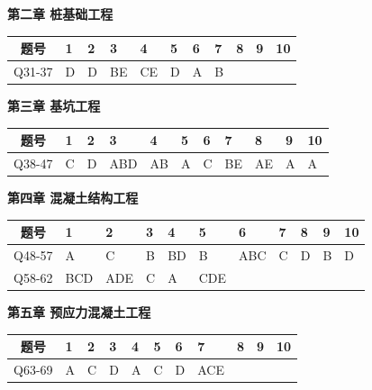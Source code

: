 \documentclass[UTF8,fontset=windows,11pt]{ctexart}
\begin{document}
\noindent\textbf{\textcolor{examnavy}{第二章  桩基础工程}}\\\vspace{0.3em}

\begin{tabularx}{\linewidth}{|c|X|X|X|X|X|X|X|X|X|X|}
\hline
\textbf{题号} & \textbf{1} & \textbf{2} & \textbf{3} & \textbf{4} & \textbf{5} & \textbf{6} & \textbf{7} & \textbf{8} & \textbf{9} & \textbf{10} \\
\hline
Q31-37 & D & D & BE & CE & D & A & B &  &  &  \\
\hline
\end{tabularx}
\vspace{0.6em}

\noindent\textbf{\textcolor{examnavy}{第三章  基坑工程}}\\\vspace{0.3em}

\begin{tabularx}{\linewidth}{|c|X|X|X|X|X|X|X|X|X|X|}
\hline
\textbf{题号} & \textbf{1} & \textbf{2} & \textbf{3} & \textbf{4} & \textbf{5} & \textbf{6} & \textbf{7} & \textbf{8} & \textbf{9} & \textbf{10} \\
\hline
Q38-47 & C & D & ABD & AB & A & C & BE & AE & A & A \\
\hline
\end{tabularx}
\vspace{0.6em}

\noindent\textbf{\textcolor{examnavy}{第四章  混凝土结构工程}}\\\vspace{0.3em}

\begin{tabularx}{\linewidth}{|c|X|X|X|X|X|X|X|X|X|X|}
\hline
\textbf{题号} & \textbf{1} & \textbf{2} & \textbf{3} & \textbf{4} & \textbf{5} & \textbf{6} & \textbf{7} & \textbf{8} & \textbf{9} & \textbf{10} \\
\hline
Q48-57 & A & C & B & BD & B & ABC & C & D & B & D \\
\hline
Q58-62 & BCD & ADE & C & A & CDE &  &  &  &  &  \\
\hline
\end{tabularx}
\vspace{0.6em}

\noindent\textbf{\textcolor{examnavy}{第五章  预应力混凝土工程}}\\\vspace{0.3em}

\begin{tabularx}{\linewidth}{|c|X|X|X|X|X|X|X|X|X|X|}
\hline
\textbf{题号} & \textbf{1} & \textbf{2} & \textbf{3} & \textbf{4} & \textbf{5} & \textbf{6} & \textbf{7} & \textbf{8} & \textbf{9} & \textbf{10} \\
\hline
Q63-69 & A & C & D & A & C & D & ACE &  &  &  \\
\hline
\end{tabularx}
\vspace{0.6em}
\end{document}
